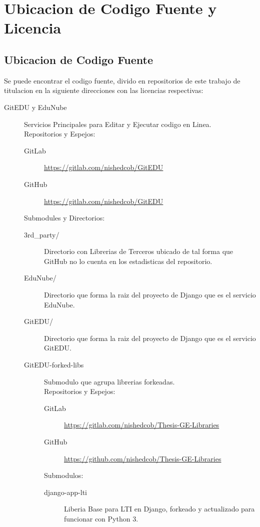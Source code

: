 
\chapter{Ubicacion de Codigo Fuente y Licencia}
\label{AnexoI} 

\section{Ubicacion de Codigo Fuente}
Se puede encontrar el codigo fuente, divido en repositorios de este trabajo de titulacion en la siguiente direcciones con las licencias respectivas:
\begin{description}
	\item[GitEDU y EduNube] Servicios Principales para Editar y Ejecutar codigo en Linea.\\
    Repositorios y Espejos:
    \begin{description}
    	\item[GitLab] \url{https://gitlab.com/nishedcob/GitEDU}
        \item[GitHub] \url{https://gitlab.com/nishedcob/GitEDU}
    \end{description}
    Submodules y Directorios:
    \begin{description}
    	\item[3rd\_party/] Directorio con Librerias de Terceros ubicado de tal forma que GitHub no lo cuenta en los estadisticas del repositorio.
        \item[EduNube/] Directorio que forma la raiz del proyecto de Django que es el servicio EduNube.
        \item[GitEDU/] Directorio que forma la raiz del proyecto de Django que es el servicio GitEDU.
        \item[GitEDU-forked-libs] Submodulo que agrupa librerias forkeadas. \\
        Repositorios y Espejos:
        \begin{description}
        	\item[GitLab] \sloppy \url{https://gitlab.com/nishedcob/Thesis-GE-Libraries}
            \item[GitHub] \sloppy \url{https://github.com/nishedcob/Thesis-GE-Libraries}
        \end{description}
    	Submodulos:
        \begin{description}
        	\item[django-app-lti] Liberia Base para LTI en Django, forkeado y actualizado para funcionar con Python 3.\\

\end{description}
\end{description}
\end{description}
